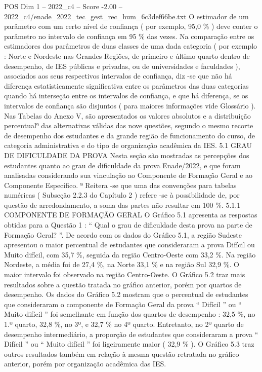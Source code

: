 \begin{textsample}{POS Dim 1 – 2022\_c4 – Score -2.00 – 2022\_c4/enade\_2022\_tec\_gest\_rec\_hum\_6c3def66be.txt}
O estimador de um parâmetro com um certo nível de confiança ( por exemplo, 95,0 \% ) deve conter o parâmetro no intervalo de confiança em 95 \% das vezes.
Na comparação entre os estimadores dos parâmetros de duas classes de uma dada categoria ( por exemplo : Norte e Nordeste nas Grandes Regiões, de primeiro e último quarto dentro de desempenho, de IES públicas e privadas, ou de universidades e faculdades ), associados aos seus respectivos intervalos de confiança, diz -se que não há diferença estatisticamente significativa entre os parâmetros das duas categorias quando há interseção entre os intervalos de confiança, e que há diferença, se os intervalos de confiança são disjuntos ( para maiores informações vide Glossário ).
Nas Tabelas do Anexo V, são apresentados os valores absolutos e a distribuição percentual⁹ das alternativas válidas das nove questões, segundo o mesmo recorte de desempenho dos estudantes e da grande região de funcionamento do curso, de categoria administrativa e do tipo de organização acadêmica da IES. 5.1 GRAU DE DIFICULDADE DA PROVA Nesta seção são mostradas as percepções dos estudantes quanto ao grau de dificuldade da prova Enade/2022, e que foram analisadas considerando sua vinculação ao Componente de Formação Geral e ao Componente Específico. ⁹ Reitera -se que uma das convenções para tabelas numéricas ( Subseção 2.2.3 do Capítulo 2 ) refere -se à possibilidade de, por questão de arredondamento, a soma das partes não resultar em 100 \%. 5.1.1 COMPONENTE DE FORMAÇÃO GERAL O Gráfico 5.1 apresenta as respostas obtidas para a Questão 1 : “ Qual o grau de dificuldade desta prova na parte de Formação Geral? ”.
De acordo com os dados do Gráfico 5.1, a região Sudeste apresentou o maior percentual de estudantes que consideraram a prova Difícil ou Muito difícil, com 35,7 \%, seguida da região Centro-Oeste com 33,2 \%.
Na região Nordeste, a média foi de 27,4 \%, na Norte 33,1 \% e na região Sul 32,9 \%.
O maior intervalo foi observado na região Centro-Oeste.
O Gráfico 5.2 traz mais resultados sobre a questão tratada no gráfico anterior, porém por quartos de desempenho.
Os dados do Gráfico 5.2 mostram que o percentual de estudantes que consideraram o componente de Formação Geral da prova “ Difícil ” ou “ Muito difícil ” foi semelhante em função dos quartos de desempenho : 32,5 \%, no 1.º quarto, 32,8 \%, no 3º, e 32,7 \% no 4º quarto.
Entretanto, no 2º quarto de desempenho intermediário, a proporção de estudantes que consideraram a prova “ Difícil ” ou “ Muito difícil ” foi ligeiramente maior ( 32,9 \% ).
O Gráfico 5.3 traz outros resultados também em relação à mesma questão retratada no gráfico anterior, porém por organização acadêmica das IES.

\end{textsample}
